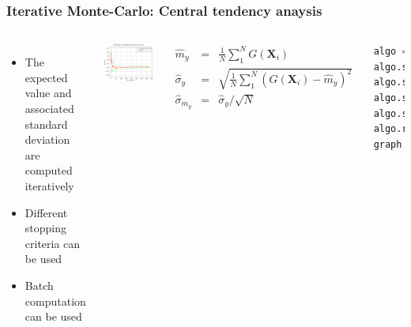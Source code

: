 \documentclass{beamer}
\renewcommand{\footnotesize}{\tiny}
\begin{document}

\begin{frame}[containsverbatim]
\frametitle{Iterative Monte-Carlo: Central tendency anaysis}

\scriptsize{

\begin{columns}

\begin{itemize}
\item The expected value and associated standard deviation are computed iteratively
\item Different stopping criteria can be used 
\item Batch computation can be used
\end{itemize}

    \includegraphics[width=.95\textwidth]{figures/Expectation.png}

    
 \footnotesize
\begin{eqnarray*}
\widehat{m}_y & = & \frac{1}{N}\sum_1^N G(\mathbf{X}_i) \\
\widehat{\sigma}_y  & = & \sqrt{\frac{1}{N}\sum_1^N (G(\mathbf{X}_i)-\hat{m}_y)^2} \\
\widehat{\sigma}_{m_y} & = & \widehat{\sigma}_y / \sqrt{N}
\end{eqnarray*}


\tiny 
\begin{lstlisting}[language=Python, numbers = none]
algo = ot.ExpectationSimulationAlgorithm(outputVector)
algo.setMaximumOuterSampling(100000)
algo.setBlockSize(1)
algo.setCoefficientOfVariationCriterionType("MAX")
algo.setMaximumCoefficientOfVariation(0.01)
algo.run()
graph = algo.drawExpectationConvergence()
\end{lstlisting}

	
\end{columns}

}

\end{frame}
\end{document}
